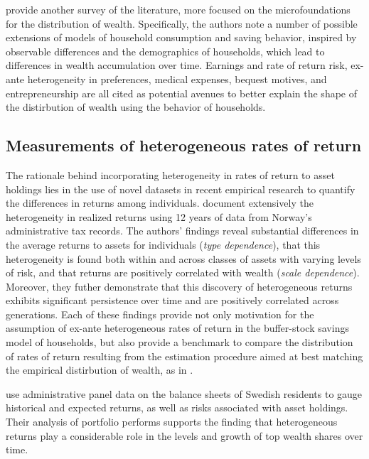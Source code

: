 \par \cite{De_Nardi2017} provide another survey of the literature, more focused on the microfoundations for the distribution of wealth. Specifically, the authors note a number of possible extensions of models of household consumption and saving behavior, inspired by observable differences and the demographics of households, which lead to differences in wealth accumulation over time. Earnings and rate of return risk, ex-ante heterogeneity in preferences, medical expenses, bequest motives, and entrepreneurship are all cited as potential avenues to better explain the shape of the distirbution of wealth using the behavior of households.

\subsection{Measurements of heterogeneous rates of return}

\par The rationale behind incorporating heterogeneity in rates of return to asset holdings lies in the use of novel datasets in recent empirical research to quantify the differences in returns among individuals. \cite{aflgdmlp20} document extensively the heterogeneity in realized returns using 12 years of data from Norway's administrative tax records. The authors' findings reveal substantial differences in the average returns to assets for individuals (\textit{type dependence}), that this heterogeneity is found both within and across classes of assets with varying levels of risk, and that returns are positively correlated with wealth  (\textit{scale dependence}). Moreover, they futher demonstrate that this discovery of heterogeneous returns exhibits significant persistence over time and are positively correlated across generations. Each of these findings provide not only motivation for the assumption of ex-ante heterogeneous rates of return in the buffer-stock savings model of households, but also provide a benchmark to compare the distribution of rates of return resulting from the estimation procedure aimed at best matching the empirical distirbution of wealth, as in \cite{cstw2017}. 

\par \cite{lblcps18} use administrative panel data on the balance sheets of Swedish residents to gauge historical and expected returns, as well as risks associated with asset holdings. Their analysis of portfolio performs supports the finding that heterogeneous returns play a considerable role in the levels and growth of top wealth shares over time.

